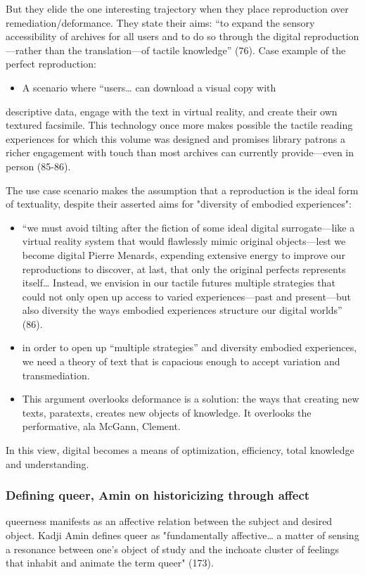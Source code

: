 \documentclass[11pt]{article}
\begin{document}
But they elide the one interesting trajectory when they place
reproduction over remediation/deformance. They state their aims: “to
expand the sensory accessibility of archives for all users and to do
so through the digital reproduction---rather than the translation---of
tactile knowledge” (76). Case example of the perfect reproduction:
\begin{itemize}
\item A scenario where “users\ldots{} can download a visual copy with
\end{itemize}
descriptive data, engage with the text in virtual reality, and create
their own textured facsimile. This technology once more makes possible
the tactile reading experiences for which this volume was designed and
promises library patrons a richer engagement with touch than most
archives can currently provide---even in person (85-86). 

The use case scenario makes the assumption that a reproduction is the
ideal form of textuality, despite their asserted aims for "diversity
of embodied experiences":
\begin{itemize}
\item “we must avoid tilting after the fiction of some ideal digital
surrogate---like a virtual reality system that would flawlessly
mimic original objects---lest we become digital Pierre Menards,
expending extensive energy to improve our reproductions to discover,
at last, that only the original perfects represents itself… Instead,
we envision in our tactile futures multiple strategies that could
not only open up access to varied experiences---past and
present---but also diversity the ways embodied experiences structure
our digital worlds” (86).
\item in order to open up “multiple strategies” and diversity embodied
experiences, we need a theory of text that is capacious enough to
accept variation and transmediation.
\item This argument overlooks deformance is a solution: the ways that
creating new texts, paratexts, creates new objects of knowledge. It
overlooks the performative, ala McGann, Clement.
\end{itemize}

In this view, digital becomes a means of optimization, efficiency,
total knowledge and understanding.
\subsubsection{Defining queer, Amin on historicizing through affect}
\label{sec:orgc41f1d3}
queerness manifests as an affective relation between the
subject and desired object. Kadji Amin defines queer as "fundamentally
affective\ldots{} a matter of sensing a resonance between one's object of
study and the inchoate cluster of feelings that inhabit and animate
the term queer" (173).
\end{document}
